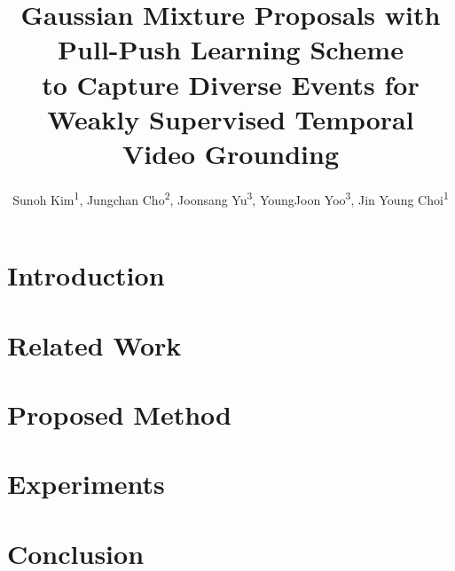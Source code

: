 \documentclass[letterpaper]{article} %
\title{Gaussian Mixture Proposals with Pull-Push Learning Scheme \\
to Capture Diverse Events for Weakly Supervised Temporal Video Grounding}
\author {
    Sunoh Kim\textsuperscript{\rm 1},
    Jungchan Cho\textsuperscript{\rm 2},
    Joonsang Yu\textsuperscript{\rm 3},
    YoungJoon Yoo\textsuperscript{\rm 3},
    Jin Young Choi\textsuperscript{\rm 1}
}
\begin{document}
\maketitle

\begin{abstract}

\end{abstract}

\section{Introduction}


\section{Related Work}


\section{Proposed Method}


\section{Experiments}


\section{Conclusion}





\end{document}
